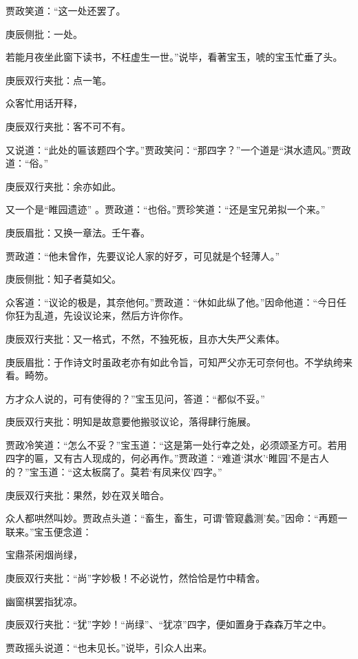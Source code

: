 \begin{parag}


    贾政笑道：“这一处还罢了。\begin{note}庚辰侧批：一处。\end{note}若能月夜坐此窗下读书，不枉虚生一世。”说毕，看著宝玉，唬的宝玉忙垂了头。\begin{note}庚辰双行夹批：点一笔。\end{note}众客忙用话开释，\begin{note}庚辰双行夹批：客不可不有。\end{note}又说道：“此处的匾该题四个字。”贾政笑问：“那四字？”一个道是“淇水遗风。”贾政道：“俗。”\begin{note}庚辰双行夹批：余亦如此。\end{note}又一个是“睢园遗迹” 。贾政道：“也俗。”贾珍笑道：“还是宝兄弟拟一个来。”\begin{note}庚辰眉批：又换一章法。壬午春。\end{note}贾政道：“他未曾作，先要议论人家的好歹，可见就是个轻薄人。”\begin{note}庚辰侧批：知子者莫如父。\end{note}众客道：“议论的极是，其奈他何。”贾政道：“休如此纵了他。”因命他道：“今日任你狂为乱道，先设议论来，然后方许你作。\begin{note}庚辰双行夹批：又一格式，不然，不独死板，且亦大失严父素体。\end{note}\begin{note}庚辰眉批：于作诗文时虽政老亦有如此令旨，可知严父亦无可奈何也。不学纨绔来看。畸笏。\end{note}方才众人说的，可有使得的？”宝玉见问，答道：“都似不妥。”\begin{note}庚辰双行夹批：明知是故意要他搬驳议论，落得肆行施展。\end{note}贾政冷笑道：“怎么不妥？”宝玉道：“这是第一处行幸之处，必须颂圣方可。若用四字的匾，又有古人现成的，何必再作。”贾政道：“难道‘淇水’‘睢园’不是古人的？”宝玉道：“这太板腐了。莫若‘有凤来仪’四字。”\begin{note}庚辰双行夹批：果然，妙在双关暗合。\end{note}众人都哄然叫妙。贾政点头道：“畜生，畜生，可谓‘管窥蠡测’矣。”因命：“再题一联来。”宝玉便念道：
\end{parag}
\begin{poem}

    \begin{pl}宝鼎茶闲烟尚绿，\end{pl}
    \begin{note}庚辰双行夹批：“尚”字妙极！不必说竹，然恰恰是竹中精舍。\end{note}
    \begin{pl}幽窗棋罢指犹凉。\end{pl}
    \begin{note}庚辰双行夹批：“犹”字妙！“尚绿”、“犹凉”四字，便如置身于森森万竿之中。\end{note}
\end{poem}
\begin{parag}

    贾政摇头说道：“也未见长。”说毕，引众人出来。
\end{parag}



